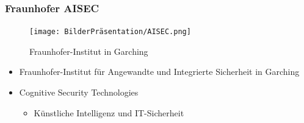 \begingroup
\frametitle{Fraunhofer AISEC}
\begin{frame}
	\begin{figure}
		\centering
		\texttt{[image: BilderPräsentation/AISEC.png]}
		\caption{Fraunhofer-Institut in Garching}
		\label{fig:enter-label}
	\end{figure}
	\vspace{0.2em}
	\begin{itemize}
		\item Fraunhofer-Institut für Angewandte und Integrierte Sicherheit in Garching
		\item Cognitive Security Technologies
		\begin{itemize}
			\item Künstliche Intelligenz und IT-Sicherheit
		\end{itemize}
	\end{itemize}
\end{frame}
\endgroup


